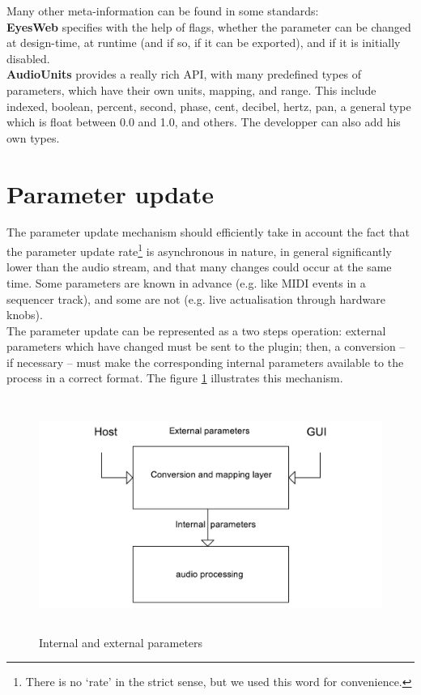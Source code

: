 \noindent Many other meta-information can be found in some standards:\\
\textbf{EyesWeb} specifies with the help of flags, whether the parameter can be changed at design-time, at runtime (and if so, if it can be exported), and if it is initially disabled.\\
\textbf{AudioUnits} provides a really rich API, with many predefined types of parameters, which have their own units, mapping, and range. This include indexed, boolean, percent, second, phase, cent, decibel, hertz, pan, a general type which is float between 0.0 and 1.0, and others. The developper can also add his own types.


\section{Parameter update}
\noindent The parameter update mechanism should efficiently take in account the fact that the parameter update rate\footnote{There is no `rate' in the strict sense, but we used this word for convenience.} is asynchronous in nature, in general significantly lower than the audio stream, and that many changes could occur at the same time. Some parameters are known in advance (e.g. like MIDI events in a sequencer track), and some are not (e.g. live actualisation through hardware knobs). \\
The parameter update can be represented as a two steps operation: external parameters which have changed must be sent to the plugin; then, a conversion -- if necessary -- must make the corresponding internal parameters available to the process in a correct format. The figure \ref{parameters} illustrates this mechanism.

\begin{figure}[htb]
\begin{center}
\includegraphics[height=3in,width=5in]{parameters}
\caption{Internal and external parameters}\label{parameters}
\end{center}
\end{figure}  

